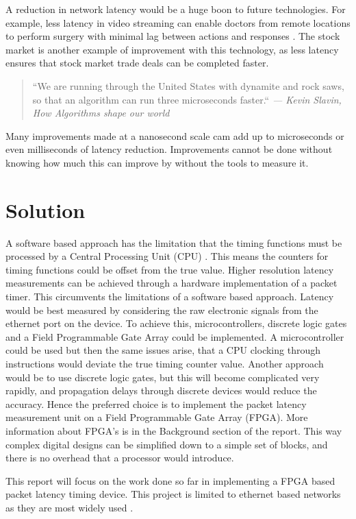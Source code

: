 \par A reduction in network latency would be a huge boon to future technologies. For example, less
latency in video streaming can enable doctors from remote locations to perform surgery with
minimal lag between actions and responses \cite{remotesurgery}. The stock market is another example of improvement with
this technology, as less latency ensures that stock market trade deals can be completed faster.

\begin{quote}
    \centering
    ``We are running through the United States with dynamite and rock saws, so that an algorithm can
    run three microseconds faster.`` \em --- Kevin Slavin, How Algorithms shape our world \cite{tedTalkAlgorithms}
\end{quote} 

Many improvements made at a nanosecond scale cam add up to microseconds or even milliseconds of latency
reduction. Improvements cannot be done without knowing how much this can improve by without the tools to measure it.

\section{Solution}

\par A software based approach has the limitation that the timing functions must be processed by a
Central Processing Unit (CPU) \cite{CPUtiming}. This means the counters for timing functions could be offset from the true value. Higher
resolution latency measurements can be achieved through a hardware implementation of a packet
timer. This circumvents the limitations of a software based approach.
Latency would be best measured by considering the raw electronic signals from the ethernet port on
the device. To achieve this, microcontrollers, discrete logic gates and a Field Programmable Gate
Array could be implemented. A microcontroller could be used but then the same issues arise, that a
CPU clocking through instructions would deviate the true timing counter value. Another approach
would be to use discrete logic gates, but this will become complicated very rapidly, and propagation
delays through discrete devices would reduce the accuracy. Hence the preferred choice is to
implement the packet latency measurement unit on a Field Programmable Gate Array (FPGA). More
information about FPGA’s is in the Background section of the report. This way complex digital
designs can be simplified down to a simple set of blocks, and there is no overhead that a processor
would introduce.

\par This report will focus on the work done so far in implementing a FPGA based packet latency timing
device. This project is limited to ethernet based networks as they are most widely used \cite{etherneteverywhere}.
